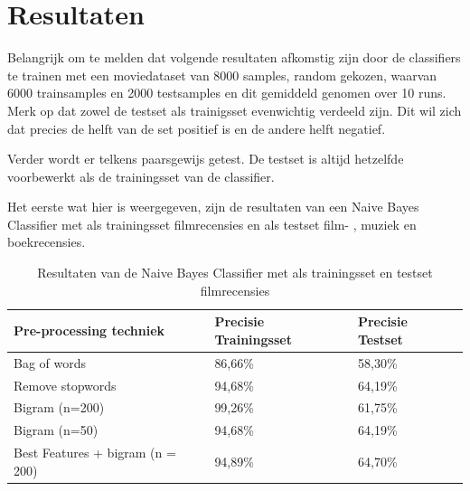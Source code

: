 \section{Resultaten}\label{Resultaten}

Belangrijk om te melden dat volgende resultaten afkomstig zijn door de classifiers te trainen met een moviedataset van 8000 samples, random gekozen, waarvan 6000 trainsamples en 2000 testsamples en dit gemiddeld genomen over 10 runs.
Merk op dat zowel de testset als trainigsset evenwichtig verdeeld zijn.  Dit wil zich dat precies de helft van de set positief is en de andere helft negatief.

Verder wordt er telkens paarsgewijs getest. De testset is altijd hetzelfde voorbewerkt als de trainingsset van de classifier.

Het eerste wat hier is weergegeven, zijn de resultaten van een Naive Bayes Classifier met als trainingsset filmrecensies en als testset film- , muziek en boekrecensies. 

\begin{table}[h]
\centering
\begin{tabular}{|l|l|l|}
\hline
\textbf{Pre-processing techniek} & \textbf{Precisie Trainingsset} &\textbf{Precisie Testset}      \\    \hline
Bag of words     & 86,66\%                        & 58,30\%                       \\    \hline
Remove stopwords & 94,68\%                        & 64,19\%                       \\    \hline
Bigram (n=200)   & 99,26\%                        & 61,75\%                       \\    \hline
Bigram (n=50)    & 94,68\%                        & 64,19\%                       \\    \hline
Best Features + bigram (n = 200) & 94,89\%        & 64,70\%                        \\    \hline
\end{tabular}
\caption{Resultaten van de Naive Bayes Classifier met als trainingsset en testset filmrecensies}
\hspace{2em}
\end{table}

